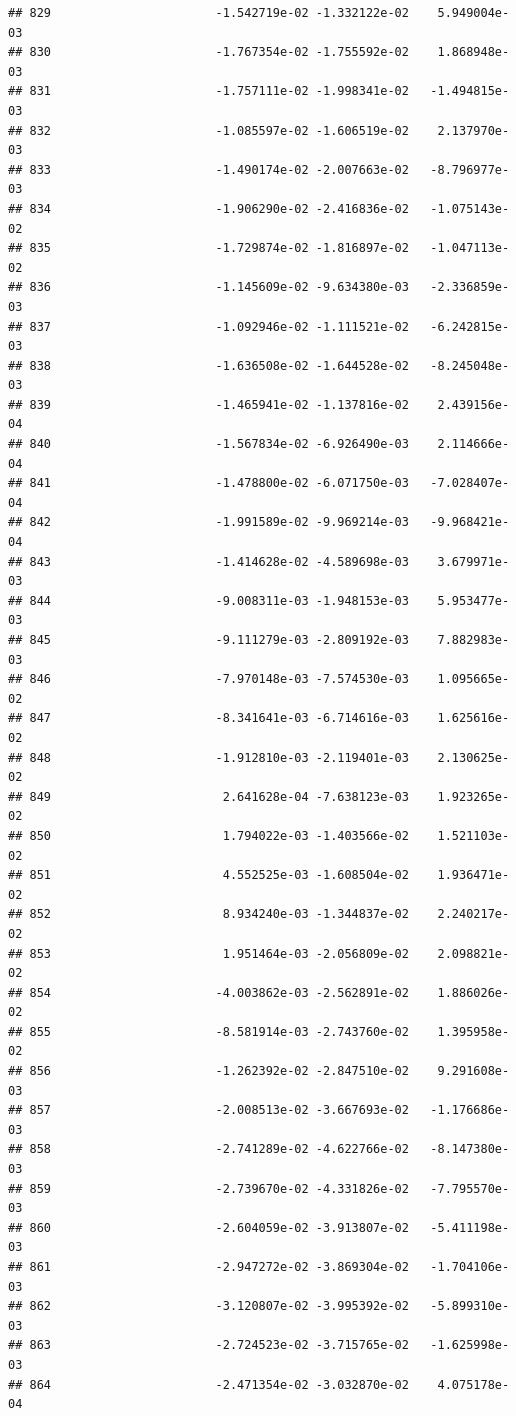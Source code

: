 \documentclass[
]{article}
\begin{document}
\begin{verbatim}
## 829                       -1.542719e-02 -1.332122e-02    5.949004e-03
## 830                       -1.767354e-02 -1.755592e-02    1.868948e-03
## 831                       -1.757111e-02 -1.998341e-02   -1.494815e-03
## 832                       -1.085597e-02 -1.606519e-02    2.137970e-03
## 833                       -1.490174e-02 -2.007663e-02   -8.796977e-03
## 834                       -1.906290e-02 -2.416836e-02   -1.075143e-02
## 835                       -1.729874e-02 -1.816897e-02   -1.047113e-02
## 836                       -1.145609e-02 -9.634380e-03   -2.336859e-03
## 837                       -1.092946e-02 -1.111521e-02   -6.242815e-03
## 838                       -1.636508e-02 -1.644528e-02   -8.245048e-03
## 839                       -1.465941e-02 -1.137816e-02    2.439156e-04
## 840                       -1.567834e-02 -6.926490e-03    2.114666e-04
## 841                       -1.478800e-02 -6.071750e-03   -7.028407e-04
## 842                       -1.991589e-02 -9.969214e-03   -9.968421e-04
## 843                       -1.414628e-02 -4.589698e-03    3.679971e-03
## 844                       -9.008311e-03 -1.948153e-03    5.953477e-03
## 845                       -9.111279e-03 -2.809192e-03    7.882983e-03
## 846                       -7.970148e-03 -7.574530e-03    1.095665e-02
## 847                       -8.341641e-03 -6.714616e-03    1.625616e-02
## 848                       -1.912810e-03 -2.119401e-03    2.130625e-02
## 849                        2.641628e-04 -7.638123e-03    1.923265e-02
## 850                        1.794022e-03 -1.403566e-02    1.521103e-02
## 851                        4.552525e-03 -1.608504e-02    1.936471e-02
## 852                        8.934240e-03 -1.344837e-02    2.240217e-02
## 853                        1.951464e-03 -2.056809e-02    2.098821e-02
## 854                       -4.003862e-03 -2.562891e-02    1.886026e-02
## 855                       -8.581914e-03 -2.743760e-02    1.395958e-02
## 856                       -1.262392e-02 -2.847510e-02    9.291608e-03
## 857                       -2.008513e-02 -3.667693e-02   -1.176686e-03
## 858                       -2.741289e-02 -4.622766e-02   -8.147380e-03
## 859                       -2.739670e-02 -4.331826e-02   -7.795570e-03
## 860                       -2.604059e-02 -3.913807e-02   -5.411198e-03
## 861                       -2.947272e-02 -3.869304e-02   -1.704106e-03
## 862                       -3.120807e-02 -3.995392e-02   -5.899310e-03
## 863                       -2.724523e-02 -3.715765e-02   -1.625998e-03
## 864                       -2.471354e-02 -3.032870e-02    4.075178e-04

\end{verbatim}
\end{document}
